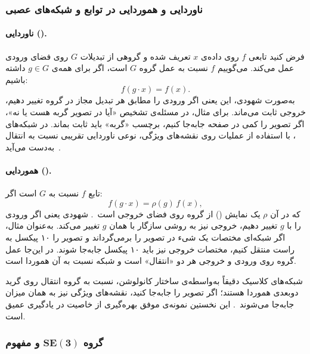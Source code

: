 \documentclass{article}
\begin{document}
\subsubsection{ناوردایی و هموردایی در توابع و شبکه‌های عصبی}

\paragraph{ناوردایی ().}

فرض کنید تابعی \(f\) روی داده‌ی \(x\) تعریف شده و گروهی از تبدیلات \(G\) روی فضای ورودی عمل می‌کند. می‌گوییم \(f\) نسبت به عمل گروه \(G\)  است، اگر برای همه‌ی \(g \in G\) داشته باشیم:
\begin{equation}
	f(g \cdot x) = f(x).
\end{equation}
به‌صورت شهودی، این یعنی اگر ورودی را مطابق هر تبدیل مجاز در گروه تغییر دهیم، خروجی ثابت می‌ماند. برای مثال، در مسئله‌ی تشخیص «آیا در تصویر گربه هست یا نه»، اگر تصویر را کمی در صفحه جابه‌جا کنیم، برچسب «گربه» باید ثابت بماند. در شبکه‌های ، با استفاده از عملیات  روی نقشه‌های ویژگی، نوعی ناوردایی تقریبی نسبت به انتقال به‌دست می‌آید~\cite{goodfellow2016deep,bishop2006pattern}.

\paragraph{هموردایی ().}

تابع \(f\) نسبت به \(G\)  است اگر:
\begin{equation}
	f(g \cdot x) = \rho(g)\, f(x),
\end{equation}
که در آن \(\rho\) یک نمایش () از گروه روی فضای خروجی است~\cite{cohen2016group,kondor2018generalization}. شهودی یعنی اگر ورودی را با \(g\) تغییر دهیم، خروجی نیز به روشی سازگار با همان \(g\) تغییر می‌کند. به‌عنوان مثال، اگر شبکه‌ای مختصات یک شیء در تصویر را برمی‌گرداند و تصویر را ۱۰ پیکسل به راست منتقل کنیم، مختصات خروجی نیز باید ۱۰ پیکسل جابه‌جا شوند. در این‌جا عمل گروه روی ورودی و خروجی هر دو «انتقال» است و شبکه نسبت به آن هموردا است.

شبکه‌های  کلاسیک دقیقاً به‌واسطه‌ی ساختار کانولوشن، نسبت به گروه انتقال روی گرید دوبعدی هموردا هستند؛ اگر تصویر را جابه‌جا کنید، نقشه‌های ویژگی نیز به همان میزان جابه‌جا می‌شوند~\cite{cohen2016group}. این نخستین نمونه‌ی موفق بهره‌گیری از خاصیت  در یادگیری عمیق است.


\subsubsection{گروه \(\boldsymbol{SE(3)}\) و مفهوم }
\end{document}
